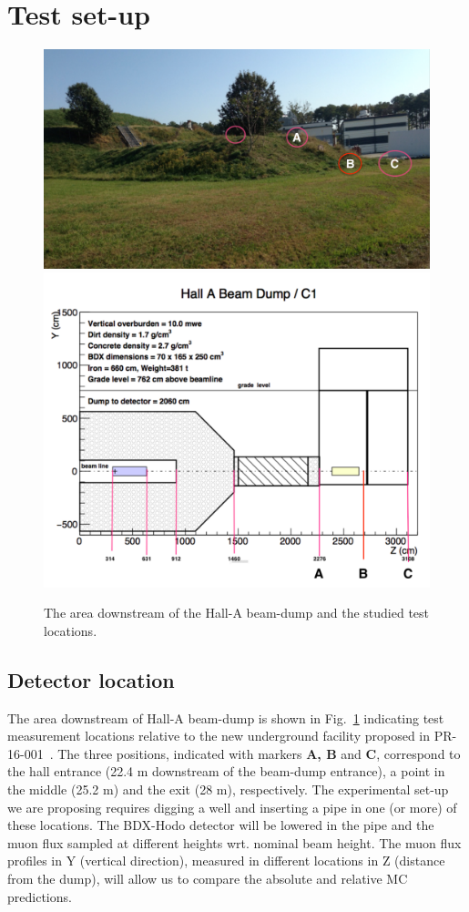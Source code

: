 \section{Test set-up}
\label{sec:setup}
\begin{figure}[h!] 
\center  
\includegraphics[width=11.5cm]{figs/ds-area.pdf}   
\includegraphics[width=11.5cm]{figs/test-plan.pdf}  
\caption{The area downstream of the Hall-A beam-dump and the studied test locations.}
\label{fig:ds-area}
\end{figure} 

\subsection{Detector location}
The area downstream of Hall-A beam-dump is shown in Fig.~\ref{fig:ds-area}  indicating test measurement locations relative to the 
new  underground facility proposed in PR-16-001~\cite{bdx-proposal}. The three positions, indicated with markers {\bf A, B}  and {\bf C},  correspond to the hall entrance (22.4 m downstream of the beam-dump entrance), a point in the middle  (25.2 m) and the exit (28 m), respectively. The experimental set-up we are proposing requires digging a well and inserting a pipe in one (or more) of these locations. The BDX-Hodo detector will be lowered in the pipe and the muon flux sampled at different heights wrt. nominal beam height. The muon flux profiles in Y (vertical direction), measured in  different locations in Z (distance from the dump), will allow us to compare the absolute and relative MC predictions. 

